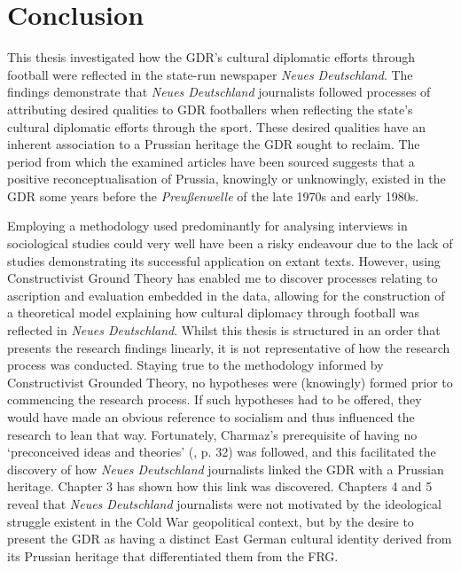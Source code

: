 \chapter{Conclusion\label{cha:conclusion}}

This thesis investigated how the GDR’s cultural diplomatic efforts through football were reflected in the state-run newspaper \textit{Neues Deutschland}. The findings demonstrate that \textit{Neues Deutschland} journalists followed processes of attributing desired qualities to GDR footballers when reflecting the state’s cultural diplomatic efforts through the sport. These desired qualities have an inherent association to a Prussian heritage the GDR sought to reclaim. The period from which the examined articles have been sourced suggests that a positive reconceptualisation of Prussia, knowingly or unknowingly, existed in the GDR some years before the \textit{Preußenwelle} of the late 1970s and early 1980s.

Employing a methodology used predominantly for analysing interviews in sociological studies could very well have been a risky endeavour due to the lack of studies demonstrating its successful application on extant texts. However, using Constructivist Ground Theory has enabled me to discover processes relating to ascription and evaluation embedded in the data, allowing for the construction of a theoretical model explaining how cultural diplomacy through football was reflected in \textit{Neues Deutschland}. Whilst this thesis is structured in an order that presents the research findings linearly, it is not representative of how the research process was conducted. Staying true to the methodology informed by Constructivist Grounded Theory, no hypotheses were (knowingly) formed prior to commencing the research process. If such hypotheses had to be offered, they would have made an obvious reference to socialism and thus influenced the research to lean that way. Fortunately, Charmaz’s prerequisite of having no ‘preconceived ideas and theories’ (\cite{charmaz2014}, p. 32) was followed, and this facilitated the discovery of how \textit{Neues Deutschland} journalists linked the GDR with a Prussian heritage. Chapter 3 has shown how this link was discovered. Chapters 4 and 5 reveal that \textit{Neues Deutschland} journalists were not motivated by the ideological struggle existent in the Cold War geopolitical context, but by the desire to present the GDR as having a distinct East German cultural identity derived from its Prussian heritage that differentiated them from the FRG.

